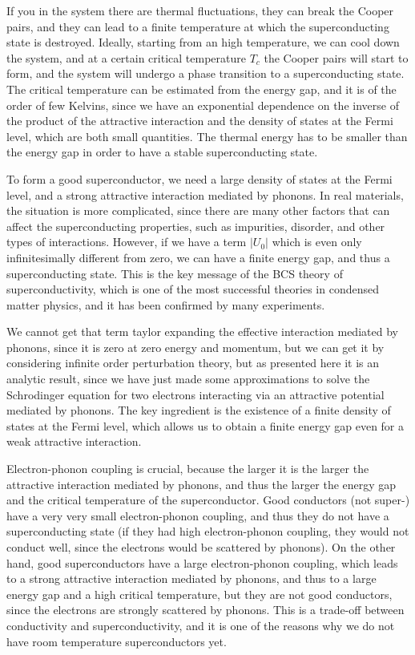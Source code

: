 If you in the system there are thermal fluctuations, they can break the Cooper pairs, and they can lead to a finite temperature at which the superconducting state is destroyed. Ideally, starting from an high temperature, we can cool down the system, and at a certain critical temperature \(T_c\) the Cooper pairs will start to form, and the system will undergo a phase transition to a superconducting state. The critical temperature can be estimated from the energy gap, and it is of the order of few Kelvins, since we have an exponential dependence on the inverse of the product of the attractive interaction and the density of states at the Fermi level, which are both small quantities. The thermal energy has to be smaller than the energy gap in order to have a stable superconducting state.

To form a good superconductor, we need a large density of states at the Fermi level, and a strong attractive interaction mediated by phonons. In real materials, the situation is more complicated, since there are many other factors that can affect the superconducting properties, such as impurities, disorder, and other types of interactions. However, if we have a term \(\vert U_0 \vert\) which is even only infinitesimally different from zero, we can have a finite energy gap, and thus a superconducting state. This is the key message of the BCS theory of superconductivity, which is one of the most successful theories in condensed matter physics, and it has been confirmed by many experiments.

We cannot get that term taylor expanding the effective interaction mediated by phonons, since it is zero at zero energy and momentum, but we can get it by considering infinite order perturbation theory, but as presented here it is an analytic result, since we have just made some approximations to solve the Schrodinger equation for two electrons interacting via an attractive potential mediated by phonons. The key ingredient is the existence of a finite density of states at the Fermi level, which allows us to obtain a finite energy gap even for a weak attractive interaction.

Electron-phonon coupling is crucial, because the larger it is the larger the attractive interaction mediated by phonons, and thus the larger the energy gap and the critical temperature of the superconductor. Good conductors (not super-) have a very very small electron-phonon coupling, and thus they do not have a superconducting state (if they had high electron-phonon coupling, they would not conduct well, since the electrons would be scattered by phonons). On the other hand, good superconductors have a large electron-phonon coupling, which leads to a strong attractive interaction mediated by phonons, and thus to a large energy gap and a high critical temperature, but they are not good conductors, since the electrons are strongly scattered by phonons. This is a trade-off between conductivity and superconductivity, and it is one of the reasons why we do not have room temperature superconductors yet.


